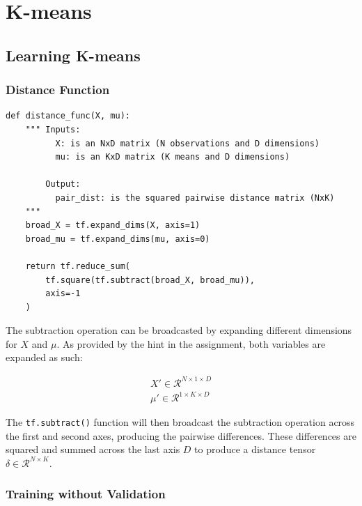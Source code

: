 \documentclass[letterpaper]{article}
\begin{document}
\section{K-means}

\subsection{Learning K-means}

\subsubsection{Distance Function}
\label{distance_func}

\begin{lstlisting}
def distance_func(X, mu):
    """ Inputs:
          X: is an NxD matrix (N observations and D dimensions)
          mu: is an KxD matrix (K means and D dimensions)
          
        Output:
          pair_dist: is the squared pairwise distance matrix (NxK)
    """
    broad_X = tf.expand_dims(X, axis=1)
    broad_mu = tf.expand_dims(mu, axis=0)

    return tf.reduce_sum(
        tf.square(tf.subtract(broad_X, broad_mu)),
        axis=-1
    )
\end{lstlisting}

\noindent
The subtraction operation can be broadcasted by expanding different dimensions for $X$ and $\mu$. As provided by the hint in the assignment, both variables are expanded as such:

\begin{align*}
X' \in \mathcal{R}^{N \times 1 \times D} \\
\mu' \in \mathcal{R}^{1 \times K \times D}
\end{align*}

\noindent
The \texttt{tf.subtract()} function will then broadcast the subtraction operation across the first and second axes, producing the pairwise differences. These differences are squared and summed across the last axis $D$ to produce a distance tensor $\delta \in \mathcal{R}^{N \times K}$.

\subsubsection{Training without Validation}
\end{document}
